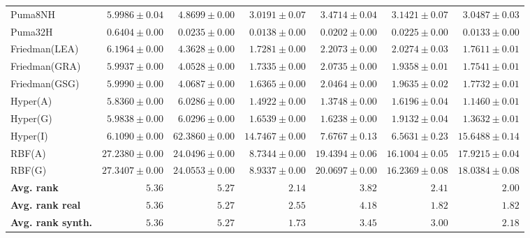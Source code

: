 \begin{table*}[!htbp]
{\begin{tabular}{lrrrrrr}
		Puma8NH & $5.9986 \pm 0.04$ & $4.8699 \pm 0.00$ & $\mathbf{3.0191 \pm 0.07}$ & $3.4714 \pm 0.04$ & $3.1421 \pm 0.07$ & $3.0487 \pm 0.03$\\
		Puma32H & $0.6404 \pm 0.00$ & $0.0235 \pm 0.00$ & $0.0138 \pm 0.00$ & $0.0202 \pm 0.00$ & $0.0225 \pm 0.00$ & $\mathbf{0.0133 \pm 0.00}$\\
		Friedman(LEA) & $6.1964 \pm 0.00$ & $4.3628 \pm 0.00$ & $\mathbf{1.7281 \pm 0.00}$ & $2.2073 \pm 0.00$ & $2.0274 \pm 0.03$ & $1.7611 \pm 0.01$\\
		Friedman(GRA) & $5.9937 \pm 0.00$ & $4.0528 \pm 0.00$ & $\mathbf{1.7335 \pm 0.00}$ & $2.0735 \pm 0.00$ & $1.9358 \pm 0.01$ & $1.7541 \pm 0.01$\\
		Friedman(GSG) & $5.9990 \pm 0.00$ & $4.0687 \pm 0.00$ & $\mathbf{1.6365 \pm 0.00}$ & $2.0464 \pm 0.00$ & $1.9635 \pm 0.02$ & $1.7732 \pm 0.01$\\
		Hyper(A) & $5.8360 \pm 0.00$ & $6.0286 \pm 0.00$ & $1.4922 \pm 0.00$ & $1.3748 \pm 0.00$ & $1.6196 \pm 0.04$ & $\mathbf{1.1460 \pm 0.01}$\\
		Hyper(G) & $5.9838 \pm 0.00$ & $6.0296 \pm 0.00$ & $1.6539 \pm 0.00$ & $1.6238 \pm 0.00$ & $1.9132 \pm 0.04$ & $\mathbf{1.3632 \pm 0.01}$\\
		Hyper(I) & $\mathbf{6.1090 \pm 0.00}$ & $62.3860 \pm 0.00$ & $14.7467 \pm 0.00$ & $7.6767 \pm 0.13$ & $6.5631 \pm 0.23$ & $15.6488 \pm 0.14$\\
		RBF(A) & $27.2380 \pm 0.00$ & $24.0496 \pm 0.00$ & $\mathbf{8.7344 \pm 0.00}$ & $19.4394 \pm 0.06$ & $16.1004 \pm 0.05$ & $17.9215 \pm 0.04$\\
		RBF(G) & $27.3407 \pm 0.00$ & $24.0553 \pm 0.00$ & $\mathbf{8.9337 \pm 0.00}$ & $20.0697 \pm 0.00$ & $16.2369 \pm 0.08$ & $18.0384 \pm 0.08$\\
		\midrule
		\textbf{{Avg. rank}} & $5.36$ & $5.27$ & $2.14$ & $3.82$ & $2.41$ & $\mathbf{2.00}$\\
		\textbf{{Avg. rank real}} & $5.36$ & $5.27$ & $2.55$ & $4.18$ & $\mathbf{1.82}$ & $\mathbf{1.82}$\\
		\textbf{{Avg. rank synth.}} & $5.36$ & $5.27$ & $\mathbf{1.73}$ & $3.45$ & $3.00$ & $2.18$\\
		\bottomrule
	\end{tabular}}
\end{table*}
